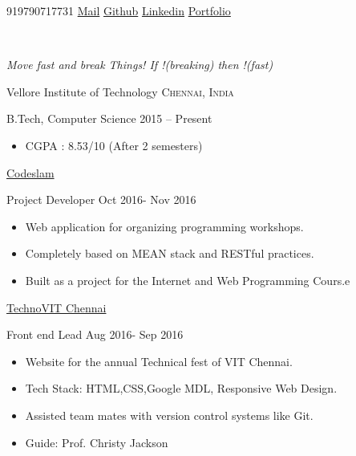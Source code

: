 \documentclass[8pt,a4paper]{article}
\begin{document}
\sloppy  %



\nobreakvspace{0.3em}  %

\centerline{\noindent
\textsmaller{+}919790717731\sbull
\href{mailto:kumarshubham347@gmail.com}{Mail}\sbull
\href{https://github.com/krshubham}{Github} \sbull
\href{http://www.linkedin.com/in/krshubham1708}{Linkedin}\sbull
\href{https://krshubham.github.io}{Portfolio}}
\\
\large{\centerline{ \textit{{Move fast and break Things! If !(breaking) then !(fast)}}}}

\spacedhrule{0.9em}{-0.4em}  %


\headedsection
  {Vellore Institute of Technology}
  {\textsc{Chennai, India}} {%
  \headedsubsection
    {B.Tech, Computer Science}
    {2015 -- Present}
    {\begin{itemize}
        \item CGPA : 8.53/10 (After 2 semesters)
    \end{itemize}}
}


\spacedhrule{0em}{-0.4em}


\headedsection
  {\href{https://github.com/krshubham/codeslam}{Codeslam}}
  {\textsc{}}
  {\headedsubsection
        {Project Developer}
        {Oct 2016- Nov 2016}
        {
        \begin{itemize}
            \item {Web application for organizing programming workshops.}
            \item {Completely based on MEAN stack and RESTful practices.}
            \item {Built as a project for the Internet and Web Programming Cours.e}
        \end{itemize}
        }
    }
    
    \headedsection
  {\href{http://technovitchennai.com}{TechnoVIT Chennai}}
  {\textsc{}} {%
  \headedsubsection
    {Front end Lead}
    {Aug 2016- Sep 2016}
    {
        \begin{itemize}
            \item {Website for the annual Technical fest of VIT Chennai.}
            \item {Tech Stack: HTML,CSS,Google MDL, Responsive Web Design.}
            \item {Assisted team mates with version control systems like Git.}
            \item {Guide: Prof. Christy Jackson}
        \end{itemize}
        }
}
\end{document}
